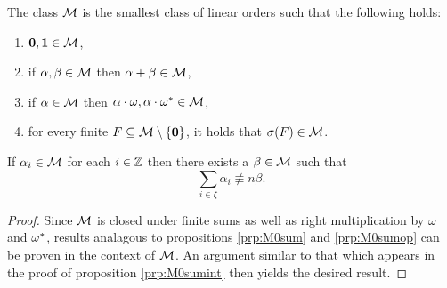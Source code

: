 \begin{dfn} The class $\mathcal{M}$ is the smallest class of linear
	orders such that the following holds:
	\begin{enumerate}
		\item	$\mathbf{0},\mathbf{1}\in\mathcal{M}$,
		\item	if $\alpha,\beta\in\mathcal{M}$ then $\alpha+\beta\in\mathcal{M}$,
		\item	if $\alpha\in\mathcal{M}$ then
		      $\alpha\cdot\omega,\alpha\cdot{\omega}^\ast\in\mathcal{M}$,
		\item	for every finite $F\subseteq\mathcal{M}\setminus\left\lbrace \mathbf{0}\right\rbrace$, it holds
		      that $\sigma(F)\in\mathcal{M}$.
	\end{enumerate}
\end{dfn}

\begin{prp}\label{prp:Msumint} If $\alpha_i\in\mathcal{M}$ for each $i\in\mathbb{Z}$ then
	there exists a $\beta\in\mathcal{M}$ such that
	\begin{equation} \sum_{i\in\zeta}\alpha_i\nequiv{n}\beta.
	\end{equation}
\end{prp}
\begin{proof} Since $\mathcal{M}$ is closed under finite sums as well as right
	multiplication by $\omega$ and ${\omega}^\ast$, results analagous to
	propositions \ref{prp:M0sum} and \ref{prp:M0sumop} can be proven in the context
	of $\mathcal{M}$.  An argument similar to that which appears in the proof of proposition
	\ref{prp:M0sumint} then yields the desired result.
\end{proof}

